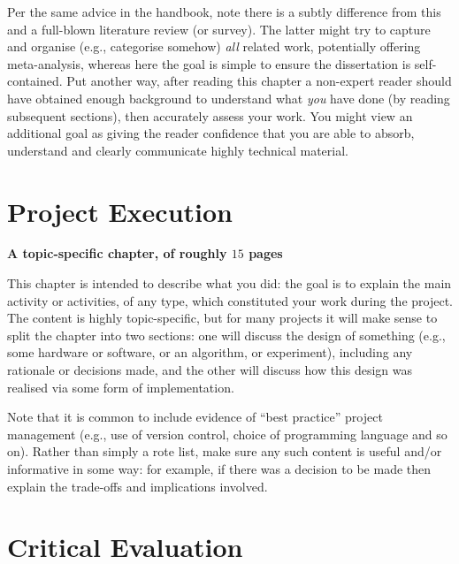 \documentclass[ %
                    author={Tom Jager},
                supervisor={Dr. Daniel Schien},
                    degree={MEng},
                     title={A Bayesian Inference Engine for UMIS Structured Data},
                  subtitle={},
                      type={research},
                      year={2019} ]{dissertation}
\begin{document}
Per the same advice in the handbook, note there is a subtly difference from
this and a full-blown literature review (or survey).  The latter might try
to capture and organise (e.g., categorise somehow) {\em all} related work,
potentially offering meta-analysis, whereas here the goal is simple to
ensure the dissertation is self-contained.  Put another way, after reading 
this chapter a non-expert reader should have obtained enough background to 
understand what {\em you} have done (by reading subsequent sections), then 
accurately assess your work.  You might view an additional goal as giving 
the reader confidence that you are able to absorb, understand and clearly 
communicate highly technical material.


\chapter{Project Execution}
\label{chap:execution}

{\bf A topic-specific chapter, of roughly $15$ pages} 
\vspace{1cm} 

\noindent
This chapter is intended to describe what you did: the goal is to explain
the main activity or activities, of any type, which constituted your work 
during the project.  The content is highly topic-specific, but for many 
projects it will make sense to split the chapter into two sections: one 
will discuss the design of something (e.g., some hardware or software, or 
an algorithm, or experiment), including any rationale or decisions made, 
and the other will discuss how this design was realised via some form of 
implementation.  

\noindent
Note that it is common to include evidence of ``best practice'' project 
management (e.g., use of version control, choice of programming language 
and so on).  Rather than simply a rote list, make sure any such content 
is useful and/or informative in some way: for example, if there was a 
decision to be made then explain the trade-offs and implications 
involved.



\chapter{Critical Evaluation}
\label{chap:evaluation}
\end{document}
